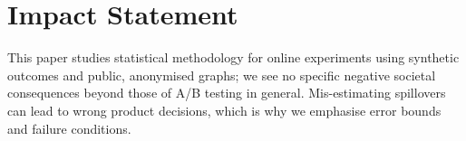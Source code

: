 \documentclass{article}
\theoremstyle{plain}
\theoremstyle{remark}
\begin{document}
\printAffiliationsAndNotice{}

\begin{abstract}

\end{abstract}








\section*{Impact Statement}
This paper studies statistical methodology for online experiments using synthetic outcomes and public, anonymised graphs; we see no specific negative societal consequences beyond those of A/B testing in general. Mis-estimating spillovers can lead to wrong product decisions, which is why we emphasise error bounds and failure conditions.




\appendix

\end{document}
